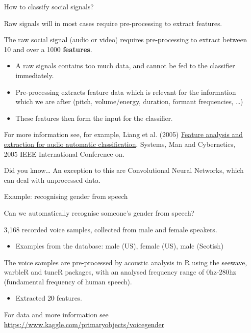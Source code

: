 \documentclass[compress]{beamer}
\begin{document}
\begin{frame}{How to classify social signals?}

Raw signals will in most cases require pre-processing to extract
features.

The raw social signal (audio or video) requires pre-processing to
extract between 10 and over a 1000 \textbf{features}.

\begin{itemize}

\item A raw signals contains too much data, and cannot be fed to the
  classifier immediately.
\item Pre-processing extracts feature data which is relevant for the
  information which we are after (pitch, volume/energy, duration,
  formant frequencies, \ldots{})
\item These features then form the input for the classifier.
\end{itemize}

For more information see, for example, Liang et al. (2005)
\href{http://ieeexplore.ieee.org/xpls/icp.jsp?arnumber=1571239}{Feature
analysis and extraction for audio automatic classification}, Systems,
Man and Cybernetics, 2005 IEEE International Conference on.

Did you know\ldots{} An exception to this are Convolutional Neural
Networks, which can deal with unprocessed data.

\end{frame}

\begin{frame}{Example: recognising gender from speech}

Can we automatically recognise someone's gender from speech?

3,168 recorded voice samples, collected from male and female speakers.

\begin{itemize}

\item Examples from the database: male (US), female (US), male (Scotish)
\end{itemize}

The voice samples are pre-processed by acoustic analysis in R using the
seewave, warbleR and tuneR packages, with an analysed frequency range of
0hz-280hz (fundamental frequency of human speech).

\begin{itemize}

\item Extracted 20 features.
\end{itemize}

For data and more information see
\url{https://www.kaggle.com/primaryobjects/voicegender}

\end{frame}
\end{document}
